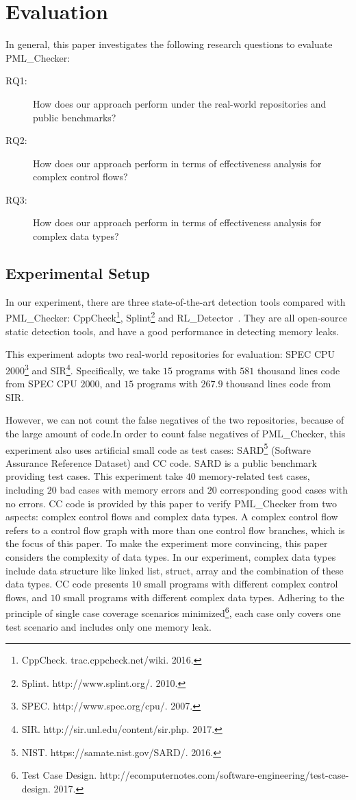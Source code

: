 \section{Evaluation}\label{sec:evaluation}

In general, this paper investigates the following research questions to evaluate PML\_Checker:
\begin{description}
\item[RQ1:] How does our approach perform under the real-world repositories and public benchmarks? 
\item[RQ2:] How does our approach perform in terms of effectiveness analysis for complex control flows? 
\item[RQ3:] How does our approach perform in terms of effectiveness analysis for complex data types? 
\end{description}

\subsection{Experimental Setup}

In our experiment, there are three state-of-the-art detection tools compared with PML\_Checker: CppCheck\footnote{CppCheck. trac.cppcheck.net/wiki. 2016.}, Splint\footnote{Splint. http://www.splint.org/. 2010.} and RL\_Detector~\cite{J14}. They are all open-source static detection tools, and have a good performance in detecting memory leaks.

This experiment adopts two real-world repositories for evaluation: SPEC CPU 2000\footnote{SPEC. http://www.spec.org/cpu/. 2007.} and SIR\footnote{SIR. http://sir.unl.edu/content/sir.php. 2017.}. Specifically, we take $15$ programs with $581$ thousand lines code from SPEC CPU $2000$, and  $15$ programs with $267.9$ thousand lines code from SIR. 

However, we can not count the false negatives of the two repositories, because of the large amount of code.In order to count false negatives of PML\_Checker, this experiment also uses artificial small code as test cases: SARD\footnote{NIST. https://samate.nist.gov/SARD/. 2016.} (Software Assurance Reference Dataset) and CC code. SARD is a public benchmark providing test cases. This experiment take $40$ memory-related test cases, including $20$ bad cases with memory errors and $20$ corresponding good cases with no errors. CC code is provided by this paper to verify PML\_Checker from two aspects: complex control flows and complex data types.
A complex control flow refers to a control flow graph with more than one control flow branches, which is the focus of this paper. To make the experiment more convincing, this paper considers the complexity of data types. In our experiment, complex data types include data structure like linked list, struct, array and the combination of these data types. CC code presents $10$ small programs with different complex control flows, and $10$ small programs with different complex data types. Adhering to the principle of single case coverage scenarios minimized\footnote{Test Case Design. http://ecomputernotes.com/software-engineering/test-case-design. 2017.}, each case only covers one test scenario and includes only one memory leak. 


